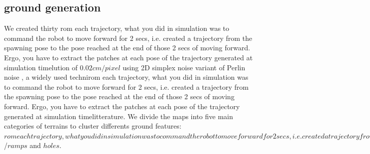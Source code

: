 \documentclass[../document.tex]{subfiles}
\begin{document}
\subsection{ground generation}
\label{subsec: heightmap-generation}
We created thirty rom each trajectory, what you did in simulation was to command the robot to move forward for 2 secs, i.e. created a trajectory from the spawning pose to the pose reached at the end of those 2 secs of moving forward. Ergo, you have to extract the patches at each pose of the trajectory generated at simulation timelution of $0.02cm/pixel$ using 2D simplex noise variant of Perlin noise \cite{perlin}, a widely used technirom each trajectory, what you did in simulation was to command the robot to move forward for 2 secs, i.e. created a trajectory from the spawning pose to the pose reached at the end of those 2 secs of moving forward. Ergo, you have to extract the patches at each pose of the trajectory generated at simulation timelitterature. We divide the maps into five main categories of terrains to cluster differents ground features: $rom each trajectory, what you did in simulation was to command the robot to move forward for 2 secs, i.e. created a trajectory from the spawning pose to the pose reached at the end of those 2 secs of moving forward. Ergo, you have to extract the patches at each pose of the trajectory generated at simulation timepes$/$ramps$ and $holes$.
\end{document}
